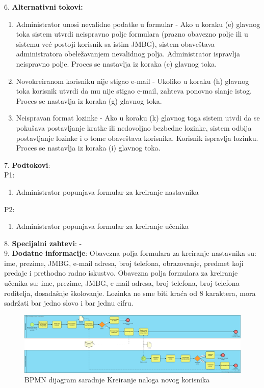 \documentclass{article}
\begin{document}
6. \textbf{Alternativni tokovi:}
\begin{enumerate} [label=(\roman*)]
\item Administrator unosi nevalidne podatke u formular - Ako u koraku (e) glavnog toka sistem utvrdi neispravno polje formulara (prazno obavezno polje ili u sistemu već postoji korisnik sa istim JMBG), sistem obaveštava administratora obeležavanjem nevalidnog polja. Administrator ispravlja neispravno polje. Proces se nastavlja iz koraka (c) glavnog toka.
\item Novokreiranom korisniku nije stigao e-mail - Ukoliko u koraku (h) glavnog toka korisnik utvrdi da mu nije stigao e-mail, zahteva ponovno slanje istog. Proces se nastavlja iz koraka (g) glavnog toka.
\item Neispravan format lozinke - Ako u koraku (k) glavnog toga sistem utvdi da se pokušava postavljanje kratke ili nedovoljno bezbedne lozinke, sistem odbija postavljanje lozinke i o tome obaveštava korisnika. Korisnik ispravlja lozinku. Proces se nastavlja iz koraka (i) glavnog toka.
\end{enumerate}

7. \textbf{Podtokovi}: \\
P1:
\begin{enumerate} [label=(\alph*)]
\item Administrator popunjava formular za kreiranje nastavnika
\end{enumerate}
P2:
\begin{enumerate} [label=(\alph*)]
\item Administrator popunjava formular za kreiranje učenika
\end{enumerate}

8. \textbf{Specijalni zahtevi}: - \\

9. \textbf{Dodatne informacije}: Obavezna polja formulara za kreiranje nastavnika su: ime, prezime, JMBG, e-mail adresa, broj telefona, obrazovanje, predmet koji predaje i prethodno radno iskustvo. Obavezna polja formulara za kreiranje učenika su: ime, prezime, JMBG, e-mail adresa, broj telefona, broj telefona roditelja, dosadašnje školovanje. Lozinka ne sme biti kraća od 8 karaktera, mora sadržati bar jedno slovo i bar jednu cifru. \\

\begin{landscape}
\begin{figure} [!ht]
    \begin{center}
        \includegraphics[scale=0.28]{imgs/BPMN_kreiranje_korisnika.png}
    \end{center}
\caption{BPMN dijagram saradnje Kreiranje naloga novog korisnika}
\end{figure}
\end{landscape}
\end{document}
